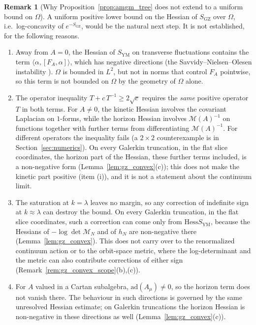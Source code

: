 \documentclass[11pt,a4paper]{amsart}
\theoremstyle{definition}
\newtheorem{remark}[theorem]{Remark}
\newcommand{\Hess}{\mathrm{Hess}}
\begin{document}
\begin{remark}[Why Proposition~\ref{prop:amgm_tree} does not extend to a uniform bound on $\Omega$]
\label{rem:no_extension}
A uniform positive lower bound on the Hessian of $S_{\mathrm{GZ}}$ over $\Omega$, i.e.\ log-concavity of $e^{-S_{\mathrm{GZ}}}$, would be the natural next step. It is not established, for the following reasons.
\begin{enumerate}[label=(\roman*)]
    \item Away from $A = 0$, the Hessian of $S_{\mathrm{YM}}$ on transverse fluctuations contains the term $\langle \alpha, [F_A, \alpha]\rangle$, which has negative directions (the Savvidy--Nielsen--Olesen instability \cite{savvidy1977infrared, nielsen1978unstable}). $\Omega$ is bounded in $L^2$, but not in norms that control $F_A$ pointwise, so this term is not bounded on $\Omega$ by the geometry of $\Omega$ alone.
    \item The operator inequality $T + c\,T^{-1} \ge 2\sqrt{c}$ requires the \emph{same} positive operator $T$ in both terms. For $A \ne 0$, the kinetic Hessian involves the covariant Laplacian on $1$-forms, while the horizon Hessian involves $\mathcal{M}(A)^{-1}$ on functions together with further terms from differentiating $\mathcal{M}(A)^{-1}$. For different operators the inequality fails (a $2\times 2$ counterexample is in Section~\ref{sec:numerics}). On every Galerkin truncation, in the flat slice coordinates, the horizon part of the Hessian, these further terms included, is a non-negative form (Lemma~\ref{lem:gz_convex}(c)); this does not make the kinetic part positive (item (i)), and it is not a statement about the continuum limit.
    \item The saturation at $k = \lambda$ leaves no margin, so any correction of indefinite sign at $k\approx\lambda$ can destroy the bound. On every Galerkin truncation, in the flat slice coordinates, such a correction can come only from $\Hess S_{\mathrm{YM}}$, because the Hessians of $-\log\det\mathcal{M}_N$ and of $h_N$ are non-negative there (Lemma~\ref{lem:gz_convex}). This does not carry over to the renormalized continuum action or to the orbit-space metric, where the log-determinant and the metric can also contribute corrections of either sign (Remark~\ref{rem:gz_convex_scope}(b),(c)).
    \item For $A$ valued in a Cartan subalgebra, $\mathrm{ad}(A_\mu) \ne 0$, so the horizon term does not vanish there. The behaviour in such directions is governed by the same unresolved Hessian estimate; on Galerkin truncations the horizon Hessian is non-negative in these directions as well (Lemma~\ref{lem:gz_convex}(c)).

\end{enumerate}
\end{remark}
\end{document}
